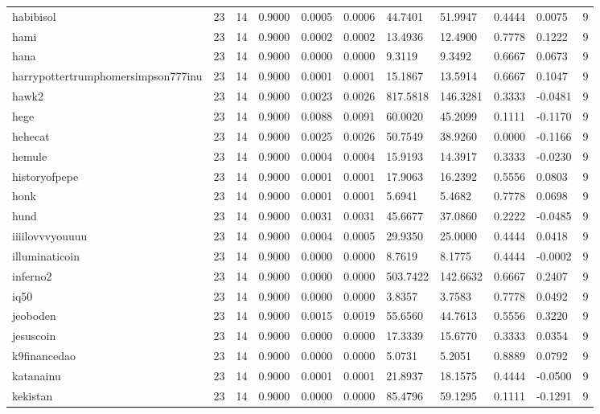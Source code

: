 \begin{table}[htbp]
\begin{tabular}{lllllllllll}
habibisol & 23 & 14 & 0.9000 & 0.0005 & 0.0006 & 44.7401 & 51.9947 & 0.4444 & 0.0075 & 9 \\
hami & 23 & 14 & 0.9000 & 0.0002 & 0.0002 & 13.4936 & 12.4900 & 0.7778 & 0.1222 & 9 \\
hana & 23 & 14 & 0.9000 & 0.0000 & 0.0000 & 9.3119 & 9.3492 & 0.6667 & 0.0673 & 9 \\
harrypottertrumphomersimpson777inu & 23 & 14 & 0.9000 & 0.0001 & 0.0001 & 15.1867 & 13.5914 & 0.6667 & 0.1047 & 9 \\
hawk2 & 23 & 14 & 0.9000 & 0.0023 & 0.0026 & 817.5818 & 146.3281 & 0.3333 & -0.0481 & 9 \\
hege & 23 & 14 & 0.9000 & 0.0088 & 0.0091 & 60.0020 & 45.2099 & 0.1111 & -0.1170 & 9 \\
hehecat & 23 & 14 & 0.9000 & 0.0025 & 0.0026 & 50.7549 & 38.9260 & 0.0000 & -0.1166 & 9 \\
hemule & 23 & 14 & 0.9000 & 0.0004 & 0.0004 & 15.9193 & 14.3917 & 0.3333 & -0.0230 & 9 \\
historyofpepe & 23 & 14 & 0.9000 & 0.0001 & 0.0001 & 17.9063 & 16.2392 & 0.5556 & 0.0803 & 9 \\
honk & 23 & 14 & 0.9000 & 0.0001 & 0.0001 & 5.6941 & 5.4682 & 0.7778 & 0.0698 & 9 \\
hund & 23 & 14 & 0.9000 & 0.0031 & 0.0031 & 45.6677 & 37.0860 & 0.2222 & -0.0485 & 9 \\
iiiilovvvyouuuu & 23 & 14 & 0.9000 & 0.0004 & 0.0005 & 29.9350 & 25.0000 & 0.4444 & 0.0418 & 9 \\
illuminaticoin & 23 & 14 & 0.9000 & 0.0000 & 0.0000 & 8.7619 & 8.1775 & 0.4444 & -0.0002 & 9 \\
inferno2 & 23 & 14 & 0.9000 & 0.0000 & 0.0000 & 503.7422 & 142.6632 & 0.6667 & 0.2407 & 9 \\
iq50 & 23 & 14 & 0.9000 & 0.0000 & 0.0000 & 3.8357 & 3.7583 & 0.7778 & 0.0492 & 9 \\
jeoboden & 23 & 14 & 0.9000 & 0.0015 & 0.0019 & 55.6560 & 44.7613 & 0.5556 & 0.3220 & 9 \\
jesuscoin & 23 & 14 & 0.9000 & 0.0000 & 0.0000 & 17.3339 & 15.6770 & 0.3333 & 0.0354 & 9 \\
k9financedao & 23 & 14 & 0.9000 & 0.0000 & 0.0000 & 5.0731 & 5.2051 & 0.8889 & 0.0792 & 9 \\
katanainu & 23 & 14 & 0.9000 & 0.0001 & 0.0001 & 21.8937 & 18.1575 & 0.4444 & -0.0500 & 9 \\
kekistan & 23 & 14 & 0.9000 & 0.0000 & 0.0000 & 85.4796 & 59.1295 & 0.1111 & -0.1291 & 9 \\

\end{tabular}
\end{table}
